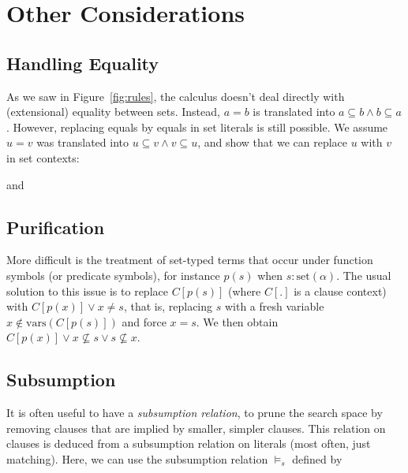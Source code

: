 \documentclass{article}
\newcommand{\set}[1]{\ensuremath{\text{set}({#1})}}
\begin{document}

\section{Other Considerations}
\subsection{Handling Equality}
As we saw in Figure~\ref{fig:rules}, the calculus doesn't deal directly
with (extensional) equality between sets. Instead, $ a = b$ is
translated into $a \subseteq b \land b \subseteq a$. However, replacing
equals by equals in set literals is still possible.
We assume $u=v$ was translated into $u \subseteq v\land v\subseteq u$,
and show that we can replace $u$ with $v$ in set contexts:

\begin{prooftree}
\end{prooftree}

and

\begin{prooftree}
\end{prooftree}

\subsection{Purification}
More difficult is the treatment of set-typed terms that occur under function
symbols (or predicate symbols), for instance $p(s)$ when $s:\set{\alpha}$.
The usual solution to this issue is
to replace $C[p(s)]$ (where $C[.]$ is a clause context) with
$C[p(x)] \lor x \not= s$, that is, replacing $s$ with a fresh variable
$x\not\in \text{vars}(C[p(s)])$ and force $x=s$. We then obtain
$C[p(x)] \lor x\not\subseteq s \lor s\not\subseteq x$.

\subsection{Subsumption}
It is often useful to have a \emph{subsumption relation}, to prune the search
space by removing clauses that are implied by smaller, simpler clauses. This
relation on clauses is deduced from a subsumption relation on literals (most
often, just matching). Here, we can use the subsumption relation $\models_s$ defined
by
\end{document}
